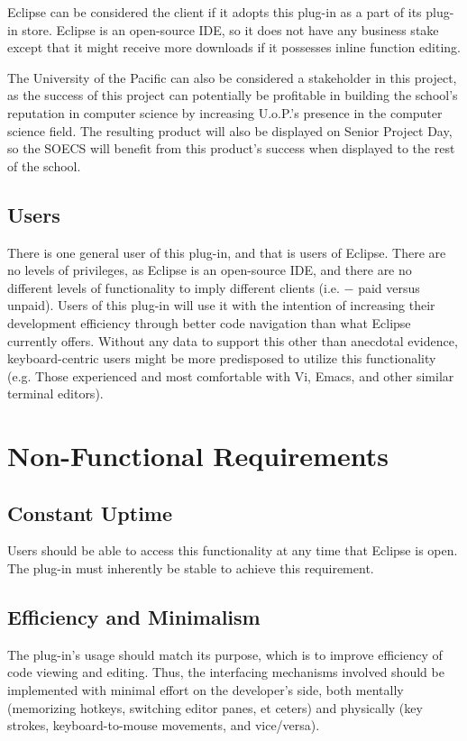 \documentclass[]{report}
\begin{document}
		Eclipse can be considered the client if it adopts this plug-in as a part of its plug-in store.  Eclipse is an open-source IDE, so it does not have any business stake except that it might receive more downloads if it possesses inline function editing.
	
		The University of the Pacific can also be considered a stakeholder in this project, as the success of this project can potentially be profitable in building the school's reputation in computer science by increasing U.o.P.'s presence in the computer science field.  The resulting product will also be displayed on Senior Project Day, so the SOECS will benefit from this product's success when displayed to the rest of the school.
	
	\section{Users}
	
		There is one general user of this plug-in, and that is users of Eclipse.  There are no levels of privileges, as Eclipse is an open-source IDE, and there are no different levels of functionality to imply different clients (i.e. $-$ paid versus unpaid). Users of this plug-in will use it with the intention of increasing their development efficiency through better code navigation than what Eclipse currently offers.  Without any data to support this other than anecdotal evidence, keyboard-centric users might be more predisposed to utilize this functionality (e.g. Those experienced and most comfortable with Vi, Emacs, and other similar terminal editors).

\chapter{Non-Functional Requirements}

	\section{Constant Uptime}
	
		Users should be able to access this functionality at any time that Eclipse is open.  The plug-in must inherently be stable to achieve this requirement.
	
	\section{Efficiency and Minimalism}
	
		The plug-in's usage should match its purpose, which is to improve efficiency of code viewing and editing.  Thus, the interfacing mechanisms involved should be implemented with minimal effort on the developer's side, both mentally (memorizing hotkeys, switching editor panes, et ceters) and physically (key strokes, keyboard-to-mouse movements, and vice/versa).
		
\end{document}

